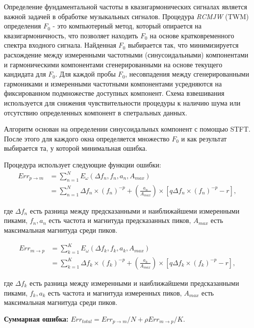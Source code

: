 Определение фундаментальной частоты в квазигармонических сигналах
является важной задачей в обработке музыкальных сигналов.
Процедура \textit{RCMJW} (TWM) определения $F_0$ -
это компьютерный метод, который опирается на квазигармоничность,
что позволяет находить $F_0$ на основе кратковременного спектра входного
сигнала.
Найденная $F_0$ выбирается так, что минимизируется расхождение между
измеренными частотными (синусоидальными) компонентами и гармоническими
компонентами сгенерированными на основе текущего кандидата для $F_0$.
Для каждой пробы $F_0$, несовпадения между сгенерированными гармониками
и измеренными частотными компонентами усредняются на фиксированном
подмножестве доступных компонент. Схема взвешивания используется для
снижения чувствительности процедуры к наличию шума или отсутствию
определенных компонент в спетральных данных.

Алгоритм основан на определении синусоидальных компонент с помощью STFT.
После этого для каждого окна определяется множество $F_0$ и как результат
выбирается та, у которой минимальная ошибка.

Процедура использует следующие функции ошибки:
\begin{align}
  Err_{p \to m} &= \sum_{n=1}^N E_\omega (\Delta f_n, f_n, a_n, A_{max}) \\
                &= \sum_{n=1}^N \Delta f_n \times (f_n) ^{-p} +
                       (\frac{a_n}{A_{max}}) \times [q \Delta f_n \times
                       (f_n)^{-p} - r],
\end{align}

где $\Delta f_n$ есть разница между предсказанными и наиближайшеми измеренными
пиками, $f_n, a_n$ есть частота и магнитуда предсказанных пиков,
$A_{max}$ есть максимальная магнитуда среди пиков.

\begin{align}
  Err_{m \to p} &= \sum_{k=1}^K E_\omega (\Delta f_k, f_k, a_k, A_{max}) \\
                &= \sum_{k=1}^K \Delta f_k \times (f_k) ^{-p} +
                       (\frac{a_k}{A_{max}}) \times [q \Delta f_k \times
                       (f_k)^{-p} - r],
\end{align}

где $\Delta f_k$ есть разница между измеренными и наиближайшеми предсказанными
пиками, $f_k, a_k$ есть частота и магнитуда измеренных пиков,
$A_{max}$ есть максимальная магнитуда среди пиков.

\textbf{Суммарная ошибка:} $Err_{total} = Err_{p \to m}/N + \rho Err_{m \to p}/K$.

